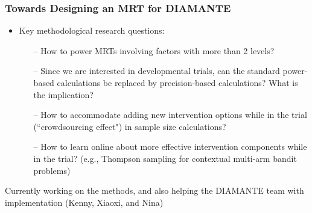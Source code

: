 \documentclass[10pt,xcolor=dvipsnames]{beamer}
\begin{document}
\begin{frame}%
\frametitle{Towards Designing an MRT for DIAMANTE}
\begin{itemize}
\item Key methodological research questions:
\bigskip
\begin{itemize}
\item[--] How to \alert{power MRTs} involving \alert{factors with more than 2 levels?} 
\bigskip
\item[--] Since we are interested in developmental trials, can the standard \alert{power-based} calculations be replaced by \alert{precision-based} calculations? What is the implication? 
\bigskip
\item[--] How to accommodate \alert{adding new intervention options while in the trial (``crowdsourcing effect")} in sample size calculations?
\bigskip
\item[--] How to \alert{learn online} about more effective intervention components while in the trial? (e.g., {\color{blue}Thompson sampling for contextual multi-arm bandit problems})
\end{itemize}
\end{itemize}
\bigskip
\begin{center}
Currently working on the methods, and also helping the DIAMANTE team with implementation (\alert{Kenny, Xiaoxi, and Nina})
\end{center}
\end{frame}


\end{document}
